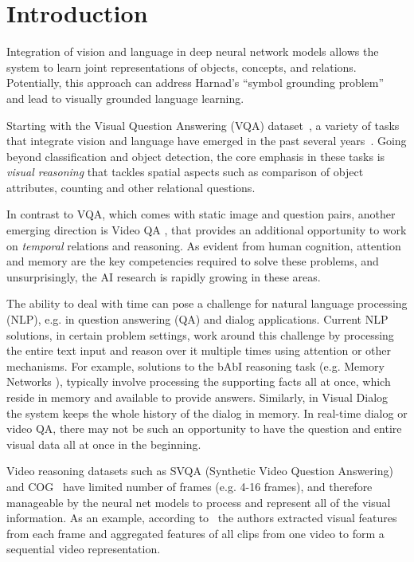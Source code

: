\section{Introduction}

Integration of vision and language in deep neural network models allows the system to learn joint representations of objects, concepts, and relations.  Potentially, this approach can address Harnad's ``symbol grounding problem''~\cite{harnad2003symbol} and lead to visually grounded language learning.

Starting with the Visual Question Answering (VQA) dataset~\cite{antol2015}, a variety of tasks that integrate vision and language have emerged in the past several years~\cite{mogadala2019trends}.  Going beyond classification and object detection, the core emphasis in these tasks is 
\emph{visual reasoning} that tackles spatial aspects such as comparison of object attributes, counting and other relational questions.

In contrast to VQA, which comes with static image and question pairs, another emerging direction is Video QA \cite{}, that 
provides an additional opportunity to work on \emph{temporal} relations and reasoning.  As evident from human cognition, attention and memory are the key competencies required to solve these problems, and unsurprisingly, the AI research is rapidly growing in these areas.

The ability to deal with time can pose a challenge for natural language processing (NLP), e.g. in question answering (QA) and dialog applications.  
Current NLP solutions, in certain problem settings, work around this challenge by processing the entire text input and reason over it multiple times using attention \cite{vaswani2017attention} or other mechanisms. For example, solutions to the bAbI reasoning task (e.g. Memory Networks \cite{weston2015towards}), typically involve processing the supporting facts all at once, which reside in memory and available to provide answers. Similarly, in Visual Dialog~\cite{das2017visual} the system keeps the whole history of the dialog in memory.  In real-time dialog or video QA, there may not be such an opportunity to have the question and entire visual data all at once in the beginning.  

Video reasoning datasets such as SVQA (Synthetic Video Question Answering)~\cite{song2018explore} and COG~\cite{yang2018dataset} have limited number of frames (e.g. 4-16 frames), and therefore manageable by the neural net models to process and represent all of the visual information.  As an example, according to~\cite{song2018explore} the authors extracted visual features from each frame and aggregated features of all clips from one video to form a sequential video representation.


